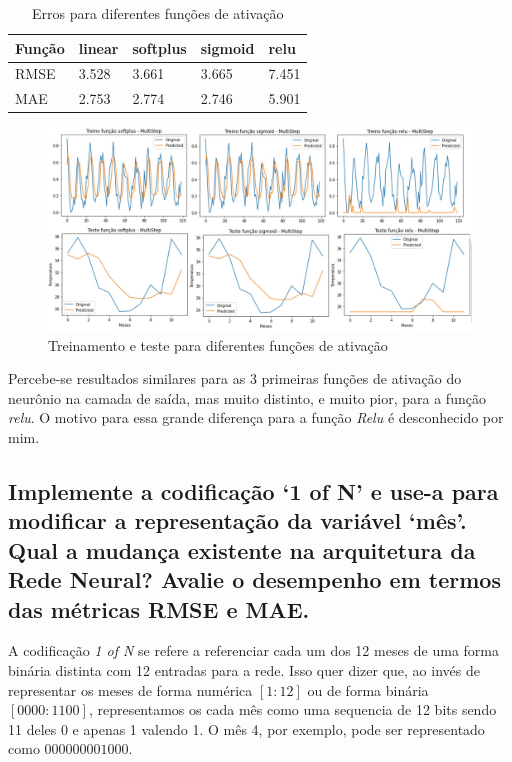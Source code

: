 \documentclass[12pt]{article}
\begin{document}
	\begin{table}[H]
		\centering
		\begin{tabular}{|l|l|l|l|l|}
			\hline
			Função & linear & softplus & sigmoid & relu  \\ \hline
			RMSE   & 3.528  & 3.661    & 3.665   & 7.451 \\ \hline
			MAE    & 2.753  & 2.774    & 2.746   & 5.901 \\ \hline
		\end{tabular}
		\caption{Erros para diferentes funções de ativação}
	\end{table}

	\begin{figure}[H]
		\centering
		\includegraphics[width=0.9\linewidth]{Imagens/topologias/InkedfuncoesAtivacao_LI}
		\caption{Treinamento e teste para diferentes funções de ativação}
		\label{fig:inkedfuncoesativacaoli}
	\end{figure}
	
	Percebe-se resultados similares para as 3 primeiras funções de ativação do neurônio na camada de saída, mas muito distinto, e muito pior, para a função \textit{relu}. O motivo para essa grande diferença para a função \textit{Relu} é desconhecido por mim.
	
	\subsection{Implemente a codificação ‘1 of N’ e use-a para modificar a representação da variável ‘mês’. Qual a mudança existente na arquitetura da Rede	Neural? Avalie o desempenho em termos das métricas RMSE e MAE.}
	
	A codificação \textit{1 of N} se refere a referenciar cada um dos 12 meses de uma forma binária distinta com 12 entradas para a rede. Isso quer dizer que, ao invés de representar os meses de forma numérica $[1: 12]$ ou de forma binária $[0000: 1100]$, representamos os cada mês como uma sequencia de 12 bits sendo 11 deles 0 e apenas 1 valendo 1. O mês 4, por exemplo, pode ser representado como $000000001000$.
	
\end{document}
